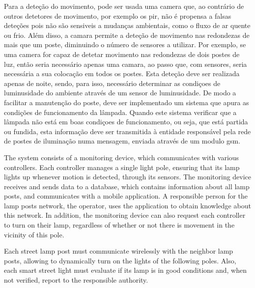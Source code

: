 Para a deteção do movimento, pode ser usada uma camera que, ao contrário de outros detetores de movimento, por exemplo os \ac{pir}, não é propensa a falsas deteções pois não são sensiveis a mudanças ambientais, como o fluxo de ar quente ou frio. Além disso, a camara permite a deteção de movimento nas redondezas de mais que um poste, diminuindo o número de sensores a utilizar. Por exemplo, se uma camera for capaz de detetar movimento nas redondezas de dois postes de luz, então seria necessário apenas uma camara, ao passo que, com sensores, seria necessária a sua colocação em todos os postes. Esta deteção deve ser realizada apenas de noite, sendo, para isso, necessário determinar as condiçoes de luminusidade do ambiente através de um sensor de luminusidade. De modo a facilitar a manutenção do poste, deve ser implementado um sistema que apura as condições de funcionamento da lâmpada. Quando este sistema verificar que a lâmpada não está em boas condiçoes de funcionamento, ou seja, que está partida ou fundida, esta informação deve ser transmitida à entidade responsável pela rede de postes de iluminação numa mensagem, enviada através de um modulo \ac{gsm}.

The system consists of a monitoring device, which communicates with various controllers. Each controller manages a single light pole, ensuring that its lamp lights up whenever motion is detected, through its sensors. The monitoring device receives and sends data to a database, which contains information about all lamp posts, and communicates with a mobile application. A responsible person for the lamp posts network, the operator, uses the application to obtain knowledge about this network. In addition, the monitoring device can also request each controller to turn on their lamp, regardless of whether or not there is movement in the vicinity of this pole.

Each street lamp post must communicate wirelessly with the neighbor lamp posts, allowing to dynamically turn on the lights of the following poles. Also, each smart street light must evaluate if its lamp is in good conditions and, when not verified, report to the responsible authority.


